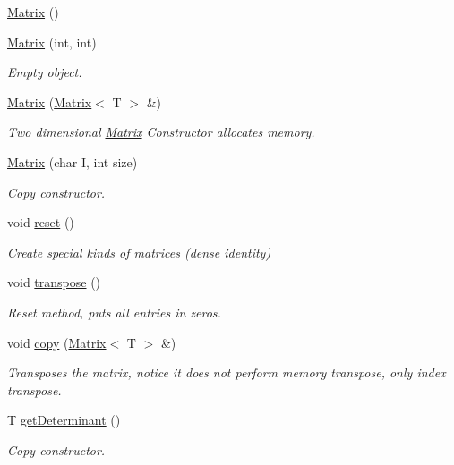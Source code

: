 \begin{DoxyCompactItemize}
\item 
\hyperlink{singletonMatrix_a9d567e3a121b1be0c3f9c461cab524fe}{Matrix} ()
\item 
\hyperlink{singletonMatrix_a949022174714dfd05d0352d3fbaf5143}{Matrix} (int, int)
\begin{DoxyCompactList}\small\item\em Empty object. \end{DoxyCompactList}\item 
\hyperlink{singletonMatrix_a15459936dd063e395c33859641155f53}{Matrix} (\hyperlink{singletonMatrix}{Matrix}$<$ T $>$ \&)
\begin{DoxyCompactList}\small\item\em Two dimensional \hyperlink{singletonMatrix}{Matrix} Constructor allocates memory. \end{DoxyCompactList}\item 
\hyperlink{singletonMatrix_a046f07c969647c44e8f7b438e993e321}{Matrix} (char I, int size)
\begin{DoxyCompactList}\small\item\em Copy constructor. \end{DoxyCompactList}\item 
void \hyperlink{singletonMatrix_af40e280112b61f6a37b54d2e5ef02e5b}{reset} ()
\begin{DoxyCompactList}\small\item\em Create special kinds of matrices (dense identity) \end{DoxyCompactList}\item 
void \hyperlink{singletonMatrix_a4b360b44312566fb94cd3e66e7088890}{transpose} ()
\begin{DoxyCompactList}\small\item\em Reset method, puts all entries in zeros. \end{DoxyCompactList}\item 
void \hyperlink{singletonMatrix_a7b8a11a3ab5ab38545d394cc60d0b96c}{copy} (\hyperlink{singletonMatrix}{Matrix}$<$ T $>$ \&)
\begin{DoxyCompactList}\small\item\em Transposes the matrix, notice it does not perform memory transpose, only index transpose. \end{DoxyCompactList}\item 
T \hyperlink{singletonMatrix_a1bf128c2250ee887b61445301ecdf789}{get\+Determinant} ()
\begin{DoxyCompactList}\small\item\em Copy constructor. \end{DoxyCompactList}\item 

\end{DoxyCompactItemize}
